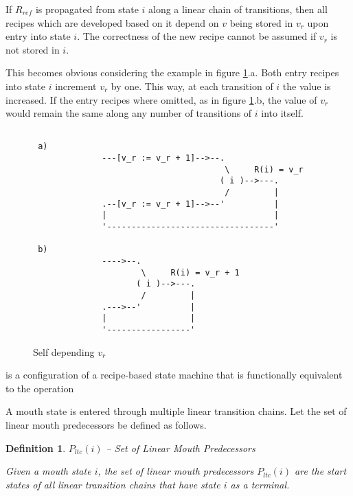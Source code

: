 \documentclass[12pt,a4paper]{scrartcl}
\newtheorem{definition}{Definition}
\begin{document}
If $R_{ref}$ is propagated from state $i$ along a linear chain of
transitions, then all recipes which are developed based on it depend on $v$
being stored in $v_r$ upon entry into state $i$.  The correctness of the new
recipe cannot be assumed if $v_r$ is not stored in $i$. 

This becomes obvious considering the example in figure \ref{fig:no-coherence}.a.
Both entry recipes into state $i$ increment $v_r$ by one. This way, at each
transition of $i$ the value is increased. If the entry recipes where omitted,
as in figure \ref{fig:no-coherence}.b, the value of $v_r$ would remain the same
along any number of transitions of $i$ into itself.



\begin{figure}[htbp] \leavevmode \label{fig:no-coherence}
\begin{verbatim}

 a)
              ---[v_r := v_r + 1]-->--.  
                                       \     R(i) = v_r
                                      ( i )-->---.
                                       /         |
              .--[v_r := v_r + 1]-->--'          |
              |                                  |
              '----------------------------------'

 b)
              ---->--.  
                      \     R(i) = v_r + 1
                     ( i )-->---.
                      /         |
              .--->--'          |
              |                 |
              '-----------------'

\end{verbatim}
\caption{Self depending $v_r$}
\end{figure}


is a configuration of a recipe-based state machine that is functionally
equivalent to the operation

A mouth state is entered through multiple linear transition chains. Let the set 
of linear mouth predecessors be defined as follows. 

\begin{definition} $P_{ltc}(i)$ -- Set of Linear Mouth Predecessors

    Given a mouth state $i$, the set of linear mouth predecessors $P_{ltc}(i)$
    are the start states of all linear transition chains that have state $i$ as
    a terminal.
    
\end{definition}
\end{document}
